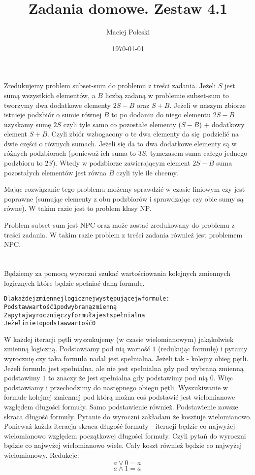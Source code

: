 \documentclass[a4paper,12pt]{article}
\title{Zadania domowe. Zestaw 4.1}
\author{Maciej Poleski}
\date{\today}
\begin{document}
\maketitle

\newpage

\section{}
Zredukujemy problem subset-sum do problemu z treści zadania. Jeżeli $S$ jest sumą wszystkich elementów, a $B$ liczbą zadaną w problemie subset-sum to tworzymy dwa dodatkowe elementy $2S-B$ oraz $S+B$. Jeżeli w naszym zbiorze istnieje podzbiór o sumie równej $B$ to po dodaniu do niego elementu $2S-B$ uzyskamy sumę $2S$ czyli tyle samo co pozostałe elementy ($S-B$) + dodatkowy element $S+B$. Czyli zbiór wzbogacony o te dwa elementy da się podzielić na dwie części o równych sumach. Jeżeli się da to dwa dodatkowe elementy są w różnych podzbiorach (ponieważ ich suma to $3S$, tymczasem suma całego jednego podzbioru to $2S$). Wtedy w podzbiorze zawierającym element $2S-B$ suma pozostałych elementów jest równa $B$ czyli tyle ile chcemy.

Mając rozwiązanie tego problemu możemy sprawdzić w czasie liniowym czy jest poprawne (sumując elementy z obu podzbiorów i sprawdzając czy obie sumy są równe). W takim razie jest to problem klasy NP.

Problem subset-sum jest NPC oraz może zostać zredukowany do problemu z treści zadania. W takim razie problem z treści zadania również jest problemem NPC.

\section{}
Będziemy za pomocą wyroczni szukać wartościowania kolejnych zmiennych logicznych które będzie spełniać daną formułę.
\begin{alltt}
 Dla każdej zmiennej logicznej występującej w formule:
    Podstaw wartość 1 pod wybraną zmienną
    Zapytaj wyrocznię czy formuła jest spełnialna
        Jeżeli nie to podstaw wartość 0
\end{alltt}
W każdej iteracji pętli wyszukujemy (w czasie wielomianowym) jakąkolwiek zmienną logiczną. Podstawiamy pod nią wartość $1$ (redukując formułę) i pytamy wyrocznię czy taka formuła nadal jest spełnialna. Jeżeli tak - kolejny obieg pętli. Jeżeli formuła jest spełnialna, ale nie jest spełnialna gdy pod wybraną zmienną podstawimy $1$ to znaczy że jest spełnialna gdy podstawimy pod nią $0$. Więc podstawiamy i przechodzimy do następnego obiegu pętli. Wyszukiwanie w formule kolejnej zmiennej pod którą można coś podstawić jest wielomianowe względem długości formuły. Samo podstawienie również. Podstawienie zawsze skraca długość formuły. Pytanie do wyroczni zakładam że kosztuje wielomianowo. Ponieważ każda iteracja skraca długość formuły - iteracji będzie co najwyżej wielomianowo względem początkowej długości formuły. Czyli pytań do wyroczni będzie co najwyżej wielomianowo wiele. Cały koszt również będzie co najwyżej wielomianowy.
Redukcje:
$$ a \vee 0 = a\ $$
$$ a \wedge 1 = a\ $$
\end{document}

